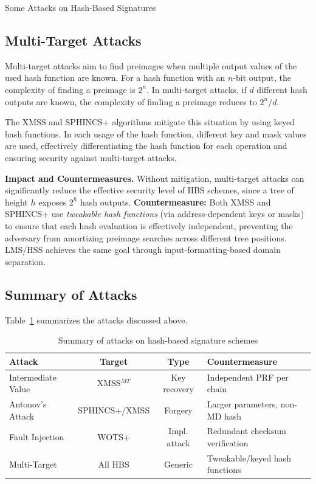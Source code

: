 \documentclass[version=preprint]{iacrcc}
\begin{document}
\begin{section}{Some Attacks on Hash-Based Signatures}
\subsection{Multi-Target Attacks}

Multi-target attacks aim to find preimages when multiple output values of the used hash function are known. For a hash function with an $n$-bit output, the complexity of finding a preimage is $2^n$. In multi-target attacks, if $d$ different hash outputs are known, the complexity of finding a preimage reduces to $2^n / d$.

The XMSS and SPHINCS+ algorithms mitigate this situation by using keyed hash functions. In each usage of the hash function, different key and mask values are used, effectively differentiating the hash function for each operation and ensuring security against multi-target attacks.

\textbf{Impact and Countermeasures.}
Without mitigation, multi-target attacks can significantly reduce the effective security level of HBS schemes, since a tree of height $h$ exposes $2^h$ hash outputs. \textbf{Countermeasure:} Both XMSS and SPHINCS+ use \emph{tweakable hash functions} (via address-dependent keys or masks) to ensure that each hash evaluation is effectively independent, preventing the adversary from amortizing preimage searches across different tree positions. LMS/HSS achieves the same goal through input-formatting-based domain separation.

\subsection{Summary of Attacks}

Table~\ref{tab:attack_summary} summarizes the attacks discussed above.

\begin{table}[ht]
\centering
\renewcommand{\arraystretch}{1.3}
\caption{Summary of attacks on hash-based signature schemes}
\label{tab:attack_summary}
\begin{tabular}{|l|c|c|l|}
\hline
\textbf{Attack} & \textbf{Target} & \textbf{Type} & \textbf{Countermeasure} \\
\hline
Intermediate Value & XMSS$^{MT}$ & Key recovery & Independent PRF per chain \\
\hline
Antonov's Attack & SPHINCS+/XMSS & Forgery & Larger parameters, non-MD hash \\
\hline
Fault Injection & WOTS+ & Impl. attack & Redundant checksum verification \\
\hline
Multi-Target & All HBS & Generic & Tweakable/keyed hash functions \\
\hline
\end{tabular}
\end{table}



\end{section}
\end{document}
